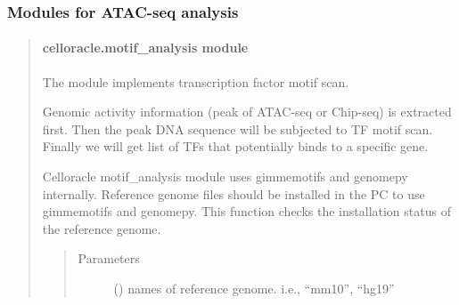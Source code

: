 \documentclass[letterpaper,10pt,english]{sphinxmanual}
\begin{document}
\subsubsection{Modules for ATAC-seq analysis}
\label{\detokenize{modules/celloracle:modules-for-atac-seq-analysis}}\begin{quote}


\paragraph{celloracle.motif\_analysis module}
\label{\detokenize{modules/celloracle.motif_analysis:module-celloracle.motif_analysis}}\label{\detokenize{modules/celloracle.motif_analysis:celloracle-motif-analysis-module}}\label{\detokenize{modules/celloracle.motif_analysis::doc}}
The {\hyperref[\detokenize{modules/celloracle.motif_analysis:module-celloracle.motif_analysis}]{}} module implements transcription factor motif scan.

Genomic activity information (peak of ATAC-seq or Chip-seq) is extracted first.
Then the peak DNA sequence will be subjected to TF motif scan.
Finally we will get list of TFs that potentially binds to a specific gene.

\begin{fulllineitems}
\label{\detokenize{modules/celloracle.motif_analysis:celloracle.motif_analysis.is_genome_installed}}
Celloracle motif\_analysis module uses gimmemotifs and genomepy internally.
Reference genome files should be installed in the PC to use gimmemotifs and genomepy.
This function checks the installation status of the reference genome.
\begin{quote}\begin{description}
\item[{Parameters}] \leavevmode
{} () \textendash{} names of reference genome. i.e., “mm10”, “hg19”

\end{description}\end{quote}

\end{fulllineitems}


\end{quote}
\end{document}

